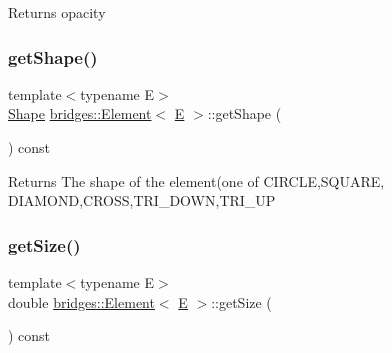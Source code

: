 \begin{DoxyReturn}{Returns}
opacity 
\end{DoxyReturn}
\mbox{\label{classbridges_1_1_element_a03170256f77ef0840cd65e3be9ab3781}} 
\subsubsection{\texorpdfstring{getShape()}{getShape()}}
{\footnotesize\ttfamily template$<$typename E$>$ \\
\mbox{\hyperlink{namespacebridges_a1b4050586bd708782ae0d4f3b06b9579}{Shape}} \mbox{\hyperlink{classbridges_1_1_element}{bridges\+::\+Element}}$<$ \mbox{\hyperlink{namespacebridges_acfb0a4f7877d8f63de3e6862004c50eda3a3ea00cfc35332cedf6e5e9a32e94da}{E}} $>$\+::get\+Shape (\begin{DoxyParamCaption}{ }\end{DoxyParamCaption}) const\hspace{0.3cm}{\ttfamily [inline]}}

\begin{DoxyReturn}{Returns}
The shape of the element(one of C\+I\+R\+C\+LE,S\+Q\+U\+A\+RE, D\+I\+A\+M\+O\+ND,C\+R\+O\+SS,T\+R\+I\+\_\+\+D\+O\+WN,T\+R\+I\+\_\+\+UP 
\end{DoxyReturn}
\mbox{\label{classbridges_1_1_element_ac3ffb20f3bdc01696130ab0cb141277f}} 
\subsubsection{\texorpdfstring{getSize()}{getSize()}}
{\footnotesize\ttfamily template$<$typename E$>$ \\
double \mbox{\hyperlink{classbridges_1_1_element}{bridges\+::\+Element}}$<$ \mbox{\hyperlink{namespacebridges_acfb0a4f7877d8f63de3e6862004c50eda3a3ea00cfc35332cedf6e5e9a32e94da}{E}} $>$\+::get\+Size (\begin{DoxyParamCaption}{ }\end{DoxyParamCaption}) const\hspace{0.3cm}{\ttfamily [inline]}}

